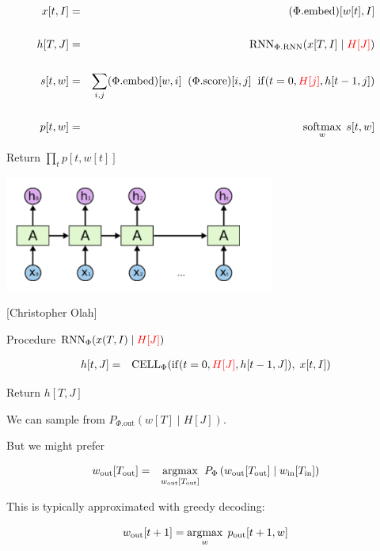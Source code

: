 {\vfill
{\huge \begin{eqnarray*}
x[t,I] & = & (\Phi.\mathrm{embed})[w[t],I] \\
\\
h[T,J] & = & \mathrm{RNN}_{\Phi.\mathrm{RNN}}(x[T,I] \;|\;{\color{red} H[J]}) \\
\\
s[t,w] & = & \sum_{i,j} (\Phi.\mathrm{embed})[w,i]\;\;(\Phi.\mathrm{score})[i,j]\;\;\mathrm{if}(t=0, {\color{red} H[j]},h[t-1,j]) \\
\\
p[t,w] & = & \operatorname*{softmax}_w\;s[t,w]
\end{eqnarray*}
}

\vfill
Return $\prod_t p[t,w[t]]$


\centerline{\includegraphics[width=3.5in]{../images/RNN}}
\centerline{{\large [Christopher Olah]}}
\vfill
Procedure $\mathrm{RNN}_\Phi(x(T,I)\;|\;{\color{red}H[J]})$

\vfill
\begin{eqnarray*}
h[t,J] & = & \mathrm{CELL}_\Phi(\mathrm{if}(t=0,{\color{red}H[J]},h[t-1,J]),\;x[t,I]) \\
\end{eqnarray*}

\vfill
Return $h[T,J]$


We can sample from $P_{\Phi.\mathrm{out}}(w[T]\;|\;H[J])$.

\vfill
But we might prefer

\begin{eqnarray*}
w_{\mathrm{out}}[T_{\mathrm{out}}]
& = & \operatorname*{argmax}_{w_{\mathrm{out}}[T_{\mathrm{out}}]} \;P_\Phi\left(w_{\mathrm{out}}[T_{\mathrm{out}}] \;|\; w_{\mathrm{in}}[T_{\mathrm{in}}] \right)
\end{eqnarray*}

\vfill
This is typically approximated with greedy decoding:

\vfill
$$w_{\mathrm{out}}[t+1] = \operatorname*{argmax}_w\; p_{\mathrm{out}}[t+1,w]$$

}
